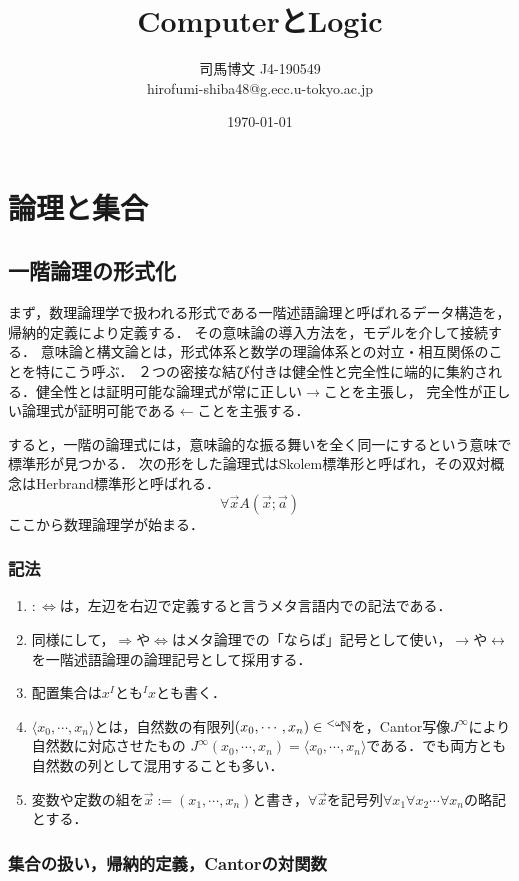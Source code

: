 \documentclass[uplatex, dvipdfmx]{jsreport}
\title{ComputerとLogic}
\author{司馬博文 J4-190549\\hirofumi-shiba48@g.ecc.u-tokyo.ac.jp}
\date{\today}
\begin{document}
\tableofcontents

\part{論理と集合}

\chapter{一階論理の形式化}

まず，数理論理学で扱われる形式である一階述語論理と呼ばれるデータ構造を，帰納的定義により定義する．
その意味論の導入方法を，モデルを介して接続する．
意味論と構文論とは，形式体系と数学の理論体系との対立・相互関係のことを特にこう呼ぶ．
２つの密接な結び付きは健全性と完全性に端的に集約される．健全性とは証明可能な論理式が常に正しい$\rightarrow$ことを主張し，
完全性が正しい論理式が証明可能である$\leftarrow$ことを主張する．

すると，一階の論理式には，意味論的な振る舞いを全く同一にするという意味で標準形が見つかる．
次の形をした論理式はSkolem標準形と呼ばれ，その双対概念はHerbrand標準形と呼ばれる．
\[ \forall\vec{x}A(\vec{x};\vec{a}) \]
ここから数理論理学が始まる．

\section{記法}

\begin{enumerate}
    \item $:\Leftrightarrow$は，左辺を右辺で定義すると言うメタ言語内での記法である．
    \item 同様にして，$\Rightarrow$や$\Leftrightarrow$はメタ論理での「ならば」記号として使い，$\to$や$\leftrightarrow$を一階述語論理の論理記号として採用する．
    \item 配置集合は$x^I$とも${}^I\!x$とも書く．
    \item $\langle x_0,\cdots,x_n\rangle$とは，自然数の有限列$(x_0,\cdots,x_n)\in{}^{<\omega}\!\mathbb{N}$を，Cantor写像$J^\infty$により自然数に対応させたもの
    $J^\infty(x_0,\cdots,x_n)=\langle x_0,\cdots,x_n\rangle$である．でも両方とも自然数の列として混用することも多い．
    \item 変数や定数の組を$\vec{x}:=(x_1,\cdots,x_n)$と書き，$\forall\vec{x}$を記号列$\forall x_1\forall x_2\cdots\forall x_n$の略記とする．
\end{enumerate}

\section{集合の扱い，帰納的定義，Cantorの対関数}
\end{document}
